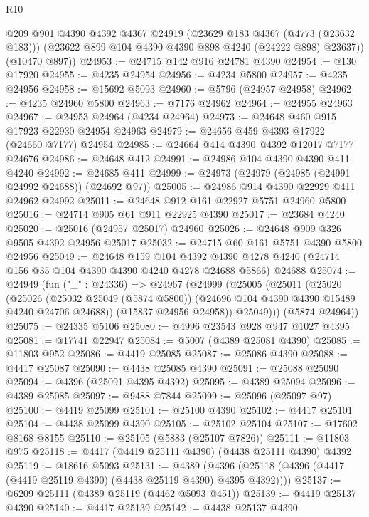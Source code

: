 \begin{lexlean}{R10}
\begin{coremodule}
        @209
        @901
        @4390
        @4392
        @4367
        @24919
        (@23629 @183 @4367 (@4773 (@23632 @183)))
        (@23622 @899 @104 @4390 @4390 @898 @4240 (@24222 @898) @23637))
      (@10470 @897))
@24953 := @24715 @142 @916 @24781 @4390
@24954 := @130 @17920
@24955 := @4235 @24954
@24956 := @4234 @5800
@24957 := @4235 @24956
@24958 := @15692 @5093
@24960 := @5796 (@24957 @24958)
@24962 := @4235 @24960 @5800
@24963 := @7176 @24962
@24964 := @24955 @24963
@24967 := @24953 @24964 (@4234 @24964)
@24973 := @24648 @460 @915 @17923 @22930 @24954 @24963
@24979 := @24656 @459 @4393 @17922 (@24660 @7177) @24954
@24985 := @24664 @414 @4390 @4392 @12017 @7177 @24676
@24986 := @24648 @412
@24991 := @24986 @104 @4390 @4390 @411 @4240
@24992 := @24685 @411
@24999 := @24973 (@24979 (@24985 (@24991 @24992 @24688)) (@24692 @97))
@25005 := @24986 @914 @4390 @22929 @411 @24962 @24992
@25011 := @24648 @912 @161 @22927 @5751 @24960 @5800
@25016 := @24714 @905 @61 @911 @22925 @4390
@25017 := @23684 @4240
@25020 := @25016 (@24957 @25017) @24960
@25026 := @24648 @909 @326 @9505 @4392 @24956 @25017
@25032 := @24715 @60 @161 @5751 @4390 @5800 @24956
@25049 := @24648
    @159
    @104
    @4392
    @4390
    @4278
    @4240
    (@24714 @156 @35 @104 @4390 @4390 @4240 @4278 @24688 @5866)
    @24688
@25074 := @24949
    (fun ("_" : @24336) =>
    @24967
      (@24999
        (@25005
          (@25011
            (@25020
              (@25026
                (@25032 @25049 (@5874 @5800))
                (@24696 @104 @4390 @4390 @15489 @4240 @24706 @24688))
              (@15837 @24956 @24958))
            @25049)))
      (@5874 @24964))
@25075 := @24335 @5106
@25080 := @4996 @23543 @928 @947 @1027 @4395
@25081 := @17741 @22947
@25084 := @5007 (@4389 @25081 @4390)
@25085 := @11803 @952
@25086 := @4419 @25085
@25087 := @25086 @4390
@25088 := @4417 @25087
@25090 := @4438 @25085 @4390
@25091 := @25088 @25090
@25094 := @4396 (@25091 @4395 @4392)
@25095 := @4389 @25094
@25096 := @4389 @25085
@25097 := @9488 @7844
@25099 := @25096 (@25097 @97)
@25100 := @4419 @25099
@25101 := @25100 @4390
@25102 := @4417 @25101
@25104 := @4438 @25099 @4390
@25105 := @25102 @25104
@25107 := @17602 @8168 @8155
@25110 := @25105 (@5883 (@25107 @7826))
@25111 := @11803 @975
@25118 := @4417 (@4419 @25111 @4390) (@4438 @25111 @4390) @4392
@25119 := @18616 @5093
@25131 := @4389
    (@4396 (@25118 (@4396 (@4417 (@4419 @25119 @4390) (@4438 @25119 @4390) @4395 @4392))))
@25137 := @6209 @25111 (@4389 @25119 (@4462 @5093 @451))
@25139 := @4419 @25137 @4390
@25140 := @4417 @25139
@25142 := @4438 @25137 @4390

\end{coremodule}
\end{lexlean}
